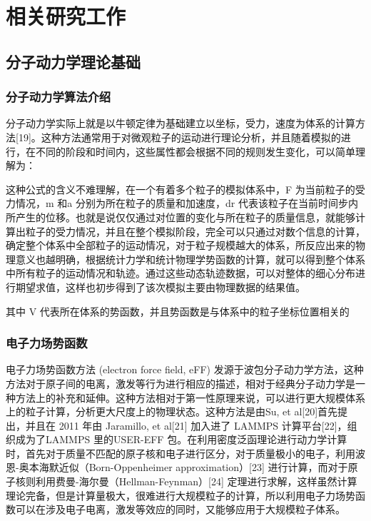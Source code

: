 
\chapter{相关研究工作}
\section{分子动力学理论基础}
\subsection{分子动力学算法介绍}
分子动力学实际上就是以牛顿定律为基础建立以坐标，受力，速度为体系的计算方法[19]。这种方法通常用于对微观粒子的运动进行理论分析，并且随着模拟的进行，在不同的阶段和时间内，这些属性都会根据不同的规则发生变化，可以简单理解为：

这种公式的含义不难理解，在一个有着多个粒子的模拟体系中，F 为当前粒子的受力情况，m 和a 分别为所在粒子的质量和加速度，dr 代表该粒子在当前时间步内所产生的位移。也就是说仅仅通过对位置的变化与所在粒子的质量信息，就能够计算出粒子的受力情况，并且在整个模拟阶段，完全可以只通过对数个信息的计算，确定整个体系中全部粒子的运动情况，对于粒子规模越大的体系，所反应出来的物理意义也越明确，根据统计力学和统计物理学势函数的计算，就可以得到整个体系中所有粒子的运动情况和轨迹。通过这些动态轨迹数据，可以对整体的细心分布进行期望求值，这样也初步得到了该次模拟主要由物理数据的结果值。

其中 V 代表所在体系的势函数，并且势函数是与体系中的粒子坐标位置相关的

\subsection{电子力场势函数}
电子力场势函数方法 (electron force field, eFF) 发源于波包分子动力学方法，这种方法对于原子间的电离，激发等行为进行相应的描述，相对于经典分子动力学是一种方法上的补充和延伸。这种方法相对于第一性原理来说，可以进行更大规模体系上的粒子计算，分析更大尺度上的物理状态。这种方法是由Su, et al[20]首先提出，并且在 2011 年由 Jaramillo, et al[21] 加入进了 LAMMPS 计算平台[22]，组织成为了LAMMPS 里的USER-EFF 包。在利用密度泛函理论进行动力学计算时，首先对于质量不匹配的原子核和电子进行区分，对于质量极小的电子，利用波恩-奥本海默近似（Born-Oppenheimer approximation）[23] 进行计算，而对于原子核则利用费曼-海尔曼（Hellman-Feynman）[24] 定理进行求解，这样虽然计算理论完备，但是计算量极大，很难进行大规模粒子的计算，所以利用电子力场势函数可以在涉及电子电离，激发等效应的同时，又能够应用于大规模粒子体系。

